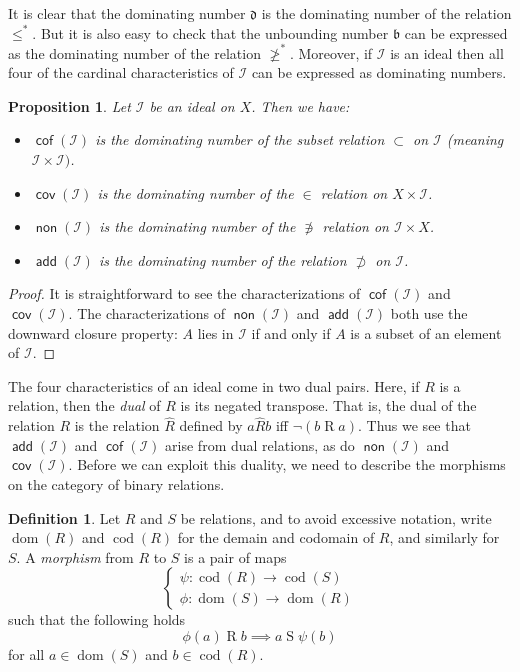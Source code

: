 \documentclass[11pt,oneside]{amsbook}
\DeclareMathOperator{\dom}{dom}
\DeclareMathOperator{\cod}{cod}
\DeclareMathOperator{\add}{\mathsf{add}}
\DeclareMathOperator{\non}{\mathsf{non}}
\DeclareMathOperator{\cov}{\mathsf{cov}}
\DeclareMathOperator{\cof}{\mathsf{cof}}
\theoremstyle{definition}
\theoremstyle{plain}
\newtheorem{proposition}[theorem]{Proposition}
\theoremstyle{definition}
\newtheorem{definition}[theorem]{Definition}
\theoremstyle{remark}
\numberwithin{equation}{section}
\numberwithin{figure}{section}
\begin{document}
It is clear that the dominating number $\mathfrak d$ is the dominating number of the relation $\leq^*$. But it is also easy to check that the unbounding number $\mathfrak b$ can be expressed as the dominating number of the relation $\not\geq^*$. Moreover, if $\mathcal I$ is an ideal then all four of the cardinal characteristics of $\mathcal I$ can be expressed as dominating numbers.

\begin{proposition}
  Let $\mathcal I$ be an ideal on $X$. Then we have:
  \begin{itemize}
  \item $\cof(\mathcal I)$ is the dominating number of the subset relation $\subset$ on $\mathcal I$ (meaning $\mathcal I\times\mathcal I)$.
  \item $\cov(\mathcal I)$ is the dominating number of the $\in$ relation on $X\times\mathcal I$.
  \item $\non(\mathcal I)$ is the dominating number of the $\not\ni$ relation on $\mathcal I\times X$.
  \item $\add(\mathcal I)$ is the dominating number of the relation $\not\supset$ on $\mathcal I$.
  \end{itemize}
\end{proposition}

\begin{proof}
  It is straightforward to see the characterizations of $\cof(\mathcal I)$ and $\cov(\mathcal I)$. The characterizations of $\non(\mathcal I)$ and $\add(\mathcal I)$ both use the downward closure property: $A$ lies in $\mathcal I$ if and only if $A$ is a subset of an element of $\mathcal I$.
\end{proof}

The four characteristics of an ideal come in two dual pairs. Here, if $R$ is a relation, then the \emph{dual} of $R$ is its negated transpose. That is, the dual of the relation $R$ is the relation $\hat R$ defined by $a\mathrel{\hat{R}}b$ iff $\neg(b\mathrel Ra)$. Thus we see that $\add(\mathcal I)$ and $\cof(\mathcal I)$ arise from dual relations, as do $\non(\mathcal I)$ and $\cov(\mathcal I)$. Before we can exploit this duality, we need to describe the morphisms on the category of binary relations.

\begin{definition}
  Let $R$ and $S$ be relations, and to avoid excessive notation, write $\dom(R)$ and $\cod(R)$ for the demain and codomain of $R$, and similarly for $S$. A \emph{morphism} from $R$ to $S$ is a pair of maps
\[\begin{cases}\psi\colon\cod(R)\to\cod(S)\\\phi\colon\dom(S)\to\dom(R)\end{cases}
\]
such that the following holds
\[\phi(a)\mathrel{R}b\implies a\mathrel{S}\psi(b)
\]
for all $a\in\dom(S)$ and $b\in\cod(R)$.
\end{definition}
\end{document}
